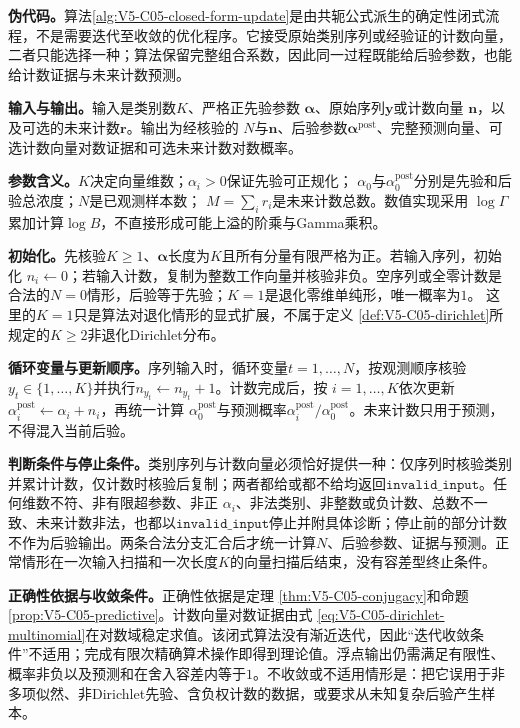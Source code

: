 \label{struct:V5-C05-CH19}
\textbf{伪代码。}算法\ref{alg:V5-C05-closed-form-update}是由共轭公式派生的确定性闭式流程，不是需要迭代至收敛的优化程序。它接受原始类别序列或经验证的计数向量，二者只能选择一种；算法保留完整组合系数，因此同一过程既能给后验参数，也能给计数证据与未来计数预测。

\label{struct:V5-C05-CH20}
\textbf{输入与输出。}输入是类别数$K$、严格正先验参数
$\boldsymbol\alpha$、原始序列$\boldsymbol y$或计数向量
$\boldsymbol n$，以及可选的未来计数$\boldsymbol r$。输出为经核验的
$N$与$\boldsymbol n$、后验参数$\boldsymbol\alpha^{\mathrm{post}}$、完整预测向量、可选计数向量对数证据和可选未来计数对数概率。

\label{struct:V5-C05-CH21}
\textbf{参数含义。}$K$决定向量维数；$\alpha_i>0$保证先验可正规化；
$\alpha_0$与$\alpha_0^{\mathrm{post}}$分别是先验和后验总浓度；$N$是已观测样本数；
$M=\sum_i r_i$是未来计数总数。数值实现采用
$\log\Gamma$累加计算$\log B$，不直接形成可能上溢的阶乘与Gamma乘积。

\label{struct:V5-C05-CH22}
\textbf{初始化。}先核验$K\ge1$、$\boldsymbol\alpha$长度为$K$且所有分量有限严格为正。若输入序列，初始化
$n_i\leftarrow0$；若输入计数，复制为整数工作向量并核验非负。空序列或全零计数是合法的$N=0$情形，后验等于先验；$K=1$是退化零维单纯形，唯一概率为$1$。
这里的$K=1$只是算法对退化情形的显式扩展，不属于定义
\ref{def:V5-C05-dirichlet}所规定的$K\ge2$非退化Dirichlet分布。

\label{struct:V5-C05-CH23}
\textbf{循环变量与更新顺序。}序列输入时，循环变量$t=1,\ldots,N$，按观测顺序核验
$y_t\in\{1,\ldots,K\}$并执行$n_{y_t}\leftarrow n_{y_t}+1$。计数完成后，按
$i=1,\ldots,K$依次更新$\alpha_i^{\mathrm{post}}\leftarrow\alpha_i+n_i$，再统一计算
$\alpha_0^{\mathrm{post}}$与预测概率$\alpha_i^{\mathrm{post}}/\alpha_0^{\mathrm{post}}$。未来计数只用于预测，不得混入当前后验。

\label{struct:V5-C05-CH24}
\textbf{判断条件与停止条件。}类别序列与计数向量必须恰好提供一种：仅序列时核验类别并累计计数，仅计数时核验后复制；两者都给或都不给均返回$\mathtt{invalid\_input}$。任何维数不符、非有限超参数、非正
$\alpha_i$、非法类别、非整数或负计数、总数不一致、未来计数非法，也都以$\mathtt{invalid\_input}$停止并附具体诊断；停止前的部分计数不作为后验输出。两条合法分支汇合后才统一计算$N$、后验参数、证据与预测。正常情形在一次输入扫描和一次长度$K$的向量扫描后结束，没有容差型终止条件。

\label{struct:V5-C05-CH25}
\textbf{正确性依据与收敛条件。}正确性依据是定理
\ref{thm:V5-C05-conjugacy}和命题\ref{prop:V5-C05-predictive}。计数向量对数证据由式
\eqref{eq:V5-C05-dirichlet-multinomial}在对数域稳定求值。该闭式算法没有渐近迭代，因此“迭代收敛条件”不适用；完成有限次精确算术操作即得到理论值。浮点输出仍需满足有限性、概率非负以及预测和在舍入容差内等于$1$。不收敛或不适用情形是：把它误用于非多项似然、非Dirichlet先验、含负权计数的数据，或要求从未知复杂后验产生样本。

